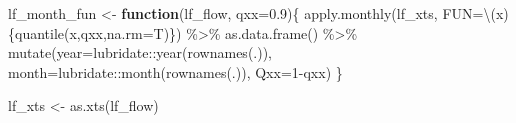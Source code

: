 \documentclass[
]{article}
\newenvironment{Shaded}{\begin{snugshade}}{\end{snugshade}}
\newcommand{\AttributeTok}[1]{\textcolor[rgb]{0.77,0.63,0.00}{#1}}
\newcommand{\ControlFlowTok}[1]{\textcolor[rgb]{0.13,0.29,0.53}{\textbf{#1}}}
\newcommand{\DecValTok}[1]{\textcolor[rgb]{0.00,0.00,0.81}{#1}}
\newcommand{\FloatTok}[1]{\textcolor[rgb]{0.00,0.00,0.81}{#1}}
\newcommand{\FunctionTok}[1]{\textcolor[rgb]{0.00,0.00,0.00}{#1}}
\newcommand{\NormalTok}[1]{#1}
\newcommand{\OtherTok}[1]{\textcolor[rgb]{0.56,0.35,0.01}{#1}}
\newcommand{\SpecialCharTok}[1]{\textcolor[rgb]{0.00,0.00,0.00}{#1}}
\begin{document}
\begin{Shaded}
\begin{Highlighting}[]
\NormalTok{lf\_month\_fun }\OtherTok{\textless{}{-}} \ControlFlowTok{function}\NormalTok{(lf\_flow, }\AttributeTok{qxx=}\FloatTok{0.9}\NormalTok{)\{}
    \FunctionTok{apply.monthly}\NormalTok{(lf\_xts, }\AttributeTok{FUN=}\NormalTok{\textbackslash{}(x)\{}\FunctionTok{quantile}\NormalTok{(x,qxx,}\AttributeTok{na.rm=}\NormalTok{T)\}) }\SpecialCharTok{\%\textgreater{}\%}
    \FunctionTok{as.data.frame}\NormalTok{() }\SpecialCharTok{\%\textgreater{}\%}
    \FunctionTok{mutate}\NormalTok{(}\AttributeTok{year=}\NormalTok{lubridate}\SpecialCharTok{::}\FunctionTok{year}\NormalTok{(}\FunctionTok{rownames}\NormalTok{(.)),}
           \AttributeTok{month=}\NormalTok{lubridate}\SpecialCharTok{::}\FunctionTok{month}\NormalTok{(}\FunctionTok{rownames}\NormalTok{(.)),}
           \AttributeTok{Qxx=}\DecValTok{1}\SpecialCharTok{{-}}\NormalTok{qxx)}
\NormalTok{\}}

\NormalTok{lf\_xts }\OtherTok{\textless{}{-}} \FunctionTok{as.xts}\NormalTok{(lf\_flow)}


\end{Highlighting}
\end{Shaded}
\end{document}
